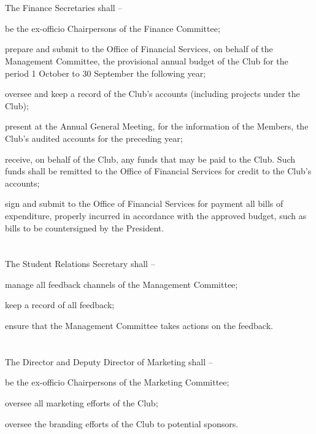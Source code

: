 \section{}
The Finance Secretaries shall –
	\begin{legal}
	\item be the ex-officio Chairpersons of the Finance Committee;
	\item prepare and submit to the Office of Financial Services, on behalf of the Management Committee, the provisional annual budget of the Club for the period 1 October to 30 September the following year;
	\item oversee and keep a record of the Club's accounts (including projects under the Club);
	\item present at the Annual General Meeting, for the information of the Members, the Club's audited accounts for the preceding year;
	\item receive, on behalf of the Club, any funds that may be paid to the Club. Such funds shall be remitted to the Office of Financial Services for credit to the Club's accounts;
	\item sign and submit to the Office of Financial Services for payment all bills of expenditure, properly incurred in accordance with the approved budget, such as bills to be countersigned by the President.
	\end{legal}

\section{}
The Student Relations Secretary shall –
	\begin{legal}
	\item manage all feedback channels of the Management Committee;
	\item keep a record of all feedback;
	\item ensure that the Management Committee takes actions on the feedback.
	\end{legal}

\section{}
The Director and Deputy Director of Marketing shall –
	\begin{legal}
	\item be the ex-officio Chairpersons of the Marketing Committee;
	\item oversee all marketing efforts of the Club;
	\item oversee the branding efforts of the Club to potential sponsors.
	\end{legal}

